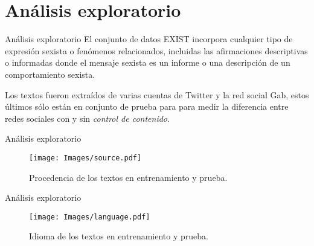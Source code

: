 \documentclass[10pt]{beamer}
\begin{document}
\section{Análisis exploratorio}
\begin{frame}{Análisis exploratorio}
\justify	
\small
El conjunto de datos EXIST incorpora cualquier tipo de expresión sexista o fenómenos relacionados, incluidas las afirmaciones descriptivas o informadas donde el mensaje sexista es un informe o una descripción de un comportamiento sexista. \medskip

Los textos fueron extraídos de varias cuentas de Twitter y la red social Gab, estos últimos sólo están en conjunto de prueba para para medir la diferencia entre redes sociales con y sin \emph{control de contenido}.

\begin{table}[H]
\centering
{}
\caption{Cantidad de textos en el conjunto de entrenamiento y prueba.}
\end{table}

\end{frame}

\begin{frame}{Análisis exploratorio}
\justify	
\small

\begin{figure}[H]
\centering
\texttt{[image: Images/source.pdf]}
\caption{Procedencia de los textos en entrenamiento y prueba.}
\end{figure}

\end{frame}

\begin{frame}{Análisis exploratorio}
\justify	
\small

\begin{figure}[H]
\centering
\texttt{[image: Images/language.pdf]}
\caption{Idioma de los textos en entrenamiento y prueba.}
\end{figure}

\end{frame} 
\end{document}
